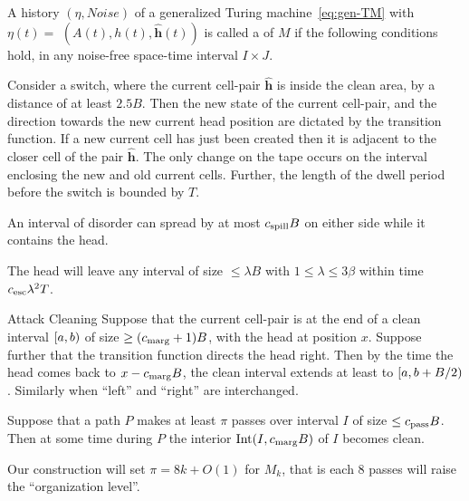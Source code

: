 \documentclass[11pt]{memoir}
\theoremstyle{definition} %
\renewcommand{\le}{\leq}
\renewcommand{\ge}{\geq}
\renewcommand{\vek}[1]{\mathbf{#1}}
\def\B{B}
\newcommand{\h}{h} %
\newcommand{\vhc}{\vek{\hat h}}
\newcommand{\Int}{\mathrm{Int}} %
\newcommand{\Noise}{\mathit{Noise}}
\newcommand{\passno}{\pi}
\newcommand{\Tu}{T}
\newcommand{\cns}[1]{c_{\textrm{\upshape #1}}}
\newcommand{\CEsc}{\cns{esc}}
\newcommand{\CMarg}{\cns{marg}}
\newcommand{\CPass}{\cns{pass}}
\newcommand{\CSpill}{\cns{spill}}
\begin{document}
  \begin{definition}[Trajectory]\label{def:traj}
\begin{sloppypar}
   A history  \( (\eta, \Noise) \) of a generalized Turing 
machine~\eqref{eq:gen-TM} with \(\eta(t) =\)
\( (A(t), \h(t), \vhc(t)) \)
is called a  of \( M \) if the following conditions hold, in any 
noise-free space-time interval \( I\times J \).
  \end{sloppypar}
\begin{description}

\item[Transition Function]\label{i:def.traj.transition}
Consider a switch, where the current cell-pair \( \vhc \)
is inside the clean area, by a distance of at least \( 2.5\B \).
Then the new state of the current cell-pair, and
the direction towards the new current head position
are dictated by the transition function.
If a new current cell has just been created then it is adjacent to the closer cell
of the pair \( \vhc \).
The only change on the tape occurs on the interval enclosing the new and old current cells.
Further, the length of the dwell period before the switch is bounded by \( \Tu \).

\item[Spill Bound]\label{i:spill-bound}
  An interval of disorder can spread by at most \( \CSpill \B \)
  on either side while it contains the head.

\item[Escape] \label{i:def.traj.escape}
  The head will leave any interval of size \( \le \lambda\B \) with \( 1\le\lambda\le 3\beta \)
  within time \( \CEsc\lambda^{2}\Tu \).

\begin{sloppypar}
\item[Attack Cleaning] \label{i:def.traj.attack-cleaning}
Suppose that the current cell-pair is at the end of a clean interval \( \left[a,b\right) \) of size
\( \ge (\CMarg+1)\B \), with the head at position \( x \).
Suppose further that the transition function directs the head right.
Then by the time the head comes back to \( x-\CMarg \B \), the clean interval 
extends at least to \( \lint{a}{b+\B/2} \).
Similarly when ``left'' and ``right'' are interchanged.
 \end{sloppypar}

\item[Pass Cleaning]
    Suppose that a path \( P \) makes at least \( \passno \) passes over interval \( I \)
  of size \( \le\CPass\B \).
  Then at some time during \( P \) the interior \( \Int(I, \CMarg\B) \) of \( I \) becomes clean.

\end{description}
\end{definition}
Our construction will set \( \passno=8k + O(1) \) for \( M_{k} \),
that is each 8 passes will raise the ``organization level''.
\end{document}
